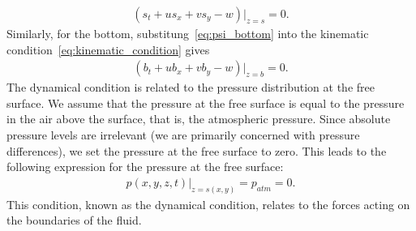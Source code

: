 \begin{align}\label{eq:kinematic_condition_free_surface}
    (s_t + u s_x + v s_y - w)|_{z=s} = 0.
\end{align}
Similarly, for the bottom, substitung~\eqref{eq:psi_bottom} into the kinematic condition~\eqref{eq:kinematic_condition} gives
\begin{align}\label{eq:kinematic_condition_bottom}
    (b_t + u b_x + v b_y - w)|_{z=b} = 0.
\end{align}
The dynamical condition is related to the pressure distribution at the free surface.
We assume that the pressure at the free surface is equal to the pressure in the air above the surface, that is, the atmospheric pressure.
Since absolute pressure levels are irrelevant (we are primarily concerned with pressure differences), we set the pressure at the free surface to zero.
This leads to the following expression for the pressure at the free surface:
\begin{align}\label{eq:pressure_free_surface}
    p(x,y,z,t)|_{z = s(x,y)} = p_{atm} = 0.
\end{align}
This condition, known as the dynamical condition, relates to the forces acting on the boundaries of the fluid.


